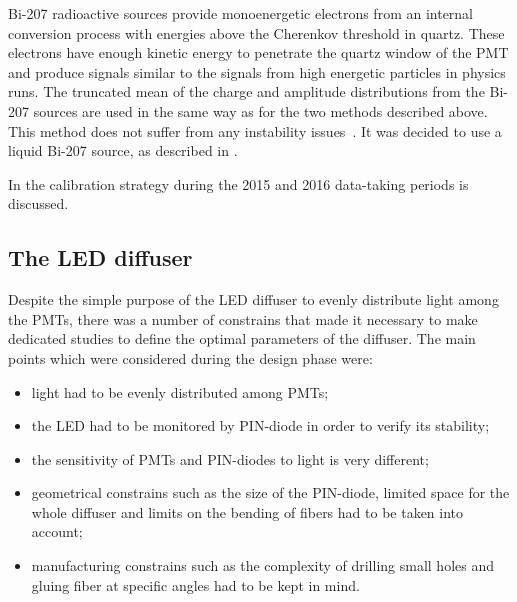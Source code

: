 Bi-207 radioactive sources provide monoenergetic electrons from an internal conversion process with energies 
above the Cherenkov threshold in quartz. These electrons
have enough kinetic energy to penetrate the quartz window of the PMT and produce signals similar to the signals 
from high energetic particles in physics runs. The truncated mean of the charge and amplitude 
distributions from the Bi-207 sources are used in the same way as for the two methods described above. 
This method does not suffer from any instability issues~\cite{Alberghi:2016tad}.
It was decided to use a liquid Bi-207 source, as described in .

In  the calibration strategy during the  2015 and 2016 data-taking periods is discussed.

\subsection{The LED diffuser}
\label{subsec:LEDDiffuser}



Despite the simple purpose of the LED diffuser to evenly distribute light among the PMTs, 
there was a number of constrains that made it necessary to make dedicated studies 
to define the optimal parameters of the diffuser. The main points which were considered during the design phase were:
\begin{itemize}
 \item light had to be evenly distributed among PMTs;
 \item the LED had to be monitored by PIN-diode in order to verify its stability;
 \item the sensitivity of PMTs and PIN-diodes to light is very different;
 \item geometrical constrains such as the size of the PIN-diode, 
       limited space for the whole diffuser and limits on the bending of fibers had to be taken into account;
 \item manufacturing constrains such as the complexity of drilling small holes and gluing fiber at specific angles had to be kept in mind.
\end{itemize}

